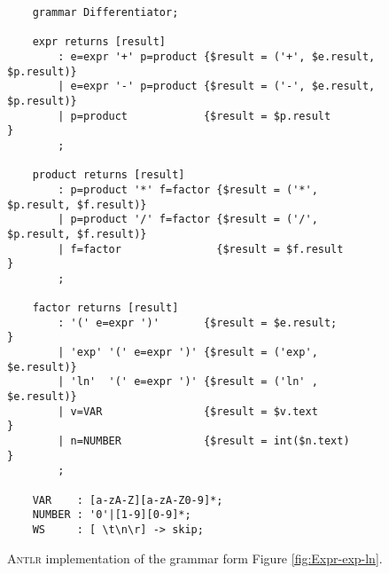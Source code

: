 \begin{figure}[!ht]
\centering
\begin{verbatim}
    grammar Differentiator;
    
    expr returns [result]
        : e=expr '+' p=product {$result = ('+', $e.result, $p.result)}
        | e=expr '-' p=product {$result = ('-', $e.result, $p.result)}
        | p=product            {$result = $p.result                  }    
        ;
    
    product returns [result]
        : p=product '*' f=factor {$result = ('*', $p.result, $f.result)}
        | p=product '/' f=factor {$result = ('/', $p.result, $f.result)}
        | f=factor               {$result = $f.result                  }
        ;
    
    factor returns [result]
        : '(' e=expr ')'       {$result = $e.result;        }
        | 'exp' '(' e=expr ')' {$result = ('exp', $e.result)}
        | 'ln'  '(' e=expr ')' {$result = ('ln' , $e.result)}
        | v=VAR                {$result = $v.text           }
        | n=NUMBER             {$result = int($n.text)      }
        ;
    
    VAR    : [a-zA-Z][a-zA-Z0-9]*;
    NUMBER : '0'|[1-9][0-9]*;
    WS     : [ \t\n\r] -> skip; 
\end{verbatim}
\vspace*{-0.3cm}
\caption{\textsc{Antlr} implementation of the grammar form Figure \ref{fig:Expr-exp-ln}.}
\label{fig:Differentiator.g4}
\end{figure}

